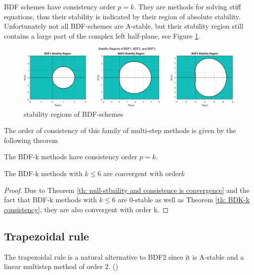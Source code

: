 	BDF schemes have consistency order $p = k$. They are methods for solving stiff equations, thus their stability is indicated by their region of absolute stability. Unfortunately not all BDF-schemes are A-stable, but their stability region still contains a large part of the complex left half-plane, see Figure \ref{fig:screenshot020}.
	
	\begin{figure}[H]
		\centering
		\includegraphics[width=1\linewidth]{pictures/bdf_stability_regions.png}
		\caption{stability regions of BDF-schemes}
		\label{fig:screenshot020}
	\end{figure}

	The order of consistency of this family of multi-step methods is given by the following theorem
	
	\begin{theorem}
		\label{th: BDK-k consistency}
		The BDF-k methods have consistency order $p=k$.
	\end{theorem}
	
	\begin{corrolary}
		The BDF-k methods with $k \leq 6$ are convergent with order$k$
	\end{corrolary}
	\begin{proof}
		Due to Theorem \ref{th: null-stbaility and consistence is convergence} and the fact that BDF-k methods with $k \leq 6$  are $0$-stable as well as Theorem \ref{th: BDK-k consistency}, they are also convergent with order k.
	\end{proof}
	
	
	
\subsection{Trapezoidal rule}
	\label{sec:Trapezoidal}
	
	The trapezoidal rule is a natural alternative to BDF2 since it is A-stable and a linear multistep method of order 2. (\cite{ModellingAndDiscretizationOfCircuitProblems})
	
